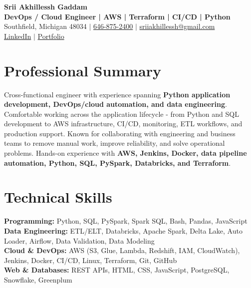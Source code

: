 \documentclass[letterpaper,10pt]{article}
\begin{document}
\fontsize{9.35pt}{10.45pt}\selectfont

\begin{center}
    {\LARGE \textbf{Srii Akhillessh Gaddam}} \\[-1pt]
    \textbf{DevOps / Cloud Engineer | AWS | Terraform | CI/CD | Python} \\[2pt]
    Southfield, Michigan 48034 $|$
    \href{tel:6468752400}{646-875-2400} $|$
    \href{mailto:sriiakhillessh@gmail.com}{sriiakhillessh@gmail.com} \\[1pt]
    \href{https://www.linkedin.com/in/srii-akhiilessh-gaddam-b48668191/}{LinkedIn} $|$
    \href{https://sriiakhillesshg.github.io/portfolio/}{Portfolio}
\end{center}
\vspace{-8pt}

\section{Professional Summary}
\small{Cross-functional engineer with experience spanning \textbf{Python application development, DevOps/cloud automation, and data engineering}. Comfortable working across the application lifecycle - from Python and SQL development to AWS infrastructure, CI/CD, monitoring, ETL workflows, and production support. Known for collaborating with engineering and business teams to remove manual work, improve reliability, and solve operational problems. Hands-on experience with \textbf{AWS, Jenkins, Docker, data pipeline automation, Python, SQL, PySpark, Databricks, and Terraform}.}

\section{Technical Skills}
\small{
\textbf{Programming:} Python, SQL, PySpark, Spark SQL, Bash, Pandas, JavaScript \\
\textbf{Data Engineering:} ETL/ELT, Databricks, Apache Spark, Delta Lake, Auto Loader, Airflow, Data Validation, Data Modeling \\
\textbf{Cloud \& DevOps:} AWS (S3, Glue, Lambda, Redshift, IAM, CloudWatch), Jenkins, Docker, CI/CD, Linux, Terraform, Git, GitHub \\
\textbf{Web \& Databases:} REST APIs, HTML, CSS, JavaScript, PostgreSQL, Snowflake, Greenplum
}
\end{document}
